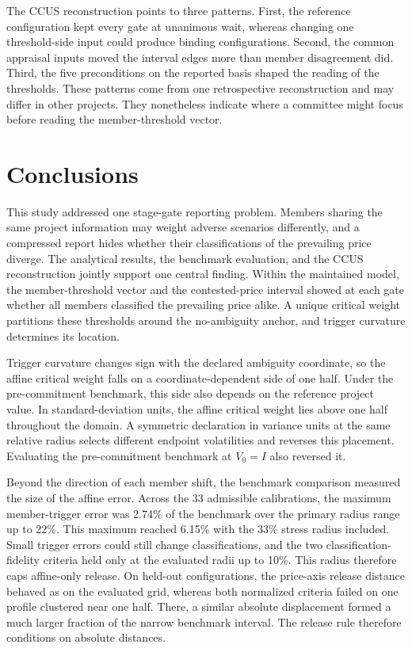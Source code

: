 \documentclass[5p,times,authoryear]{elsarticle}
\theoremstyle{plain}
\begin{document}
The CCUS reconstruction points to three patterns. First, the reference configuration kept every gate at unanimous wait, whereas changing one threshold-side input could produce binding configurations. Second, the common appraisal inputs moved the interval edges more than member disagreement did. Third, the five preconditions on the reported basis shaped the reading of the thresholds. These patterns come from one retrospective reconstruction and may differ in other projects. They nonetheless indicate where a committee might focus before reading the member-threshold vector.

\section{Conclusions}

This study addressed one stage-gate reporting problem. Members sharing the same project information may weight adverse scenarios differently, and a compressed report hides whether their classifications of the prevailing price diverge. The analytical results, the benchmark evaluation, and the CCUS reconstruction jointly support one central finding. Within the maintained model, the member-threshold vector and the contested-price interval showed at each gate whether all members classified the prevailing price alike. A unique critical weight partitions these thresholds around the no-ambiguity anchor, and trigger curvature determines its location.

Trigger curvature changes sign with the declared ambiguity coordinate, so the affine critical weight falls on a coordinate-dependent side of one half. Under the pre-commitment benchmark, this side also depends on the reference project value. In standard-deviation units, the affine critical weight lies above one half throughout the domain. A symmetric declaration in variance units at the same relative radius selects different endpoint volatilities and reverses this placement. Evaluating the pre-commitment benchmark at $V_0=I$ also reversed it.

Beyond the direction of each member shift, the benchmark comparison measured the size of the affine error. Across the 33 admissible calibrations, the maximum member-trigger error was 2.74\% of the benchmark over the primary radius range up to 22\%. This maximum reached 6.15\% with the 33\% stress radius included. Small trigger errors could still change classifications, and the two classification-fidelity criteria held only at the evaluated radii up to 10\%. This radius therefore caps affine-only release. On held-out configurations, the price-axis release distance behaved as on the evaluated grid, whereas both normalized criteria failed on one profile clustered near one half. There, a similar absolute displacement formed a much larger fraction of the narrow benchmark interval. The release rule therefore conditions on absolute distances.
\end{document}
